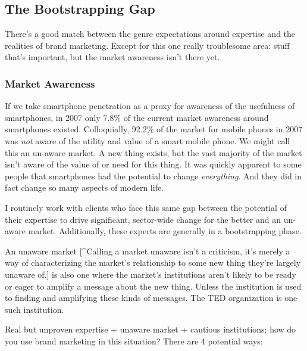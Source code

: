 \documentclass[13pt,]{tufte-handout}
\begin{document}
\hypertarget{the-bootstrapping-gap}{%
\subsection{The Bootstrapping Gap}\label{the-bootstrapping-gap}}

There's a good match between the genre expectations around expertise and
the realities of brand marketing. Except for this one really troublesome
area: stuff that's important, but the market awareness isn't there yet.

\hypertarget{market-awareness}{%
\subsubsection{Market Awareness}\label{market-awareness}}

If we take smartphone penetration as a proxy for awareness of the
usefulness of smartphones, in 2007 only 7.8\% of the current market
awareness around smartphones existed. Colloquially, 92.2\% of the market
for mobile phones in 2007 was \emph{not} aware of the utility and value
of a smart mobile phone. We might call this an un-aware market. A new
thing exists, but the vast majority of the market isn't aware of the
value of or need for this thing. It was quickly apparent to some people
that smartphones had the potential to change \emph{everything}. And they
did in fact change so many aspects of modern life.

I routinely work with clients who face this same gap between the
potential of their expertise to drive significant, sector-wide change
for the better and an un-aware market. Additionally, these experts are
generally in a bootstrapping phase.

An unaware market {[}\^{}Calling a market unaware isn't a criticism,
it's merely a way of characterizing the market's relationship to some
new thing they're largely unaware of.{]} is also one where the market's
institutions aren't likely to be ready or eager to amplify a message
about the new thing. Unless the institution is used to finding and
amplifying these kinds of messages. The TED organization is one such
institution.

Real but unproven expertise + unaware market + cautious institutions;
how do you use brand marketing in this situation? There are 4 potential
ways:
\end{document}
